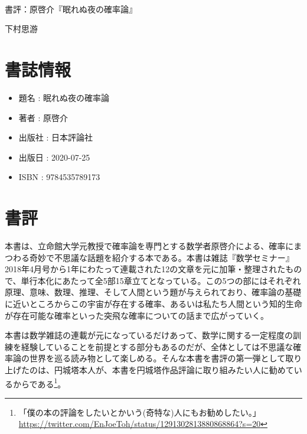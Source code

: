 \documentclass[10pt, a5paper, twoside]{jsarticle}
\theoremstyle{definition}
\begin{document}
	{\Large 　} %

	\begin{center}

		\Large{書評：原啓介『眠れぬ夜の確率論』}

		\vspace{3mm}
		
		\large{下村思游}

	\end{center}

	\section{書誌情報}

		\begin{itemize}
			
			\item 題名 : 眠れぬ夜の確率論

			\item 著者 : 原啓介

			\item 出版社 : 日本評論社

			\item 出版日 : 2020-07-25

			\item ISBN : 9784535789173
		
		\end{itemize}

	\section{書評}

		本書は、立命館大学元教授で確率論を専門とする数学者原啓介による、確率にまつわる奇妙で不思議な話題を紹介する本である。本書は雑誌『数学セミナー』2018年4月号から1年にわたって連載された12の文章を元に加筆・整理されたもので、単行本化にあたって全5部15章立てとなっている。この5つの部にはそれぞれ原理、意味、数理、推理、そして人間という題が与えられており、確率論の基礎に近いところからこの宇宙が存在する確率、あるいは私たち人間という知的生命が存在可能な確率といった突飛な確率についての話まで広がっていく。

		本書は数学雑誌の連載が元になっているだけあって、数学に関する一定程度の訓練を経験していることを前提とする部分もあるのだが、全体としては不思議な確率論の世界を巡る読み物として楽しめる。そんな本書を書評の第一弾として取り上げたのは、円城塔本人が、本書を円城塔作品評論に取り組みたい人に勧めているからである\footnote{「僕の本の評論をしたいとかいう(奇特な)人にもお勧めしたい。」 \\ \url{https://twitter.com/EnJoeToh/status/1291302813880868864?s=20}}。
\end{document}
